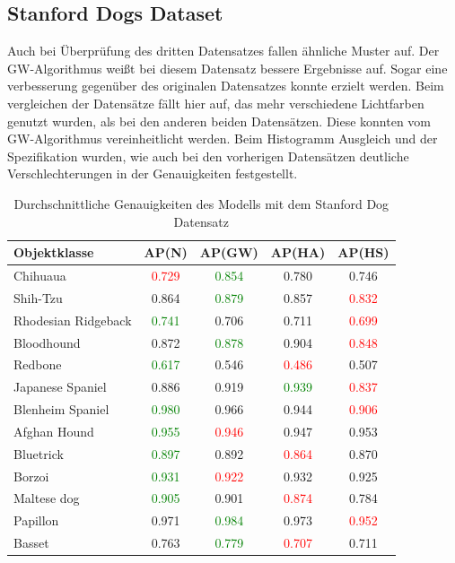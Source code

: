 \documentclass[a4paper,12pt,oneside]{article}
\begin{document}
  \subsection{Stanford Dogs Dataset}
Auch bei Überprüfung des dritten Datensatzes fallen ähnliche Muster auf. Der GW-Algorithmus weißt bei diesem Datensatz bessere Ergebnisse auf. Sogar eine verbesserung gegenüber des originalen Datensatzes konnte erzielt werden. Beim vergleichen der Datensätze fällt hier auf, das mehr verschiedene Lichtfarben genutzt wurden, als bei den anderen beiden Datensätzen. Diese konnten vom GW-Algorithmus vereinheitlicht werden. Beim Histogramm Ausgleich und der Spezifikation wurden, wie auch bei den vorherigen Datensätzen deutliche Verschlechterungen in der Genauigkeiten festgestellt.   
\begin{table}
[h]
\caption{Durchschnittliche Genauigkeiten des Modells mit dem Stanford Dog Datensatz}
\centering
\begin{tabular}{|l|c|c|c|c|}
\hline
Objektklasse & AP(N) & AP(GW) & AP(HA) & AP(HS)\\
\hline
Chihuaua & \textcolor{red}{0.729} & \textcolor{green}{0.854} & 0.780 & 0.746\\ 
Shih-Tzu & 0.864 & \textcolor{green}{0.879} & 0.857 & \textcolor{red}{0.832}\\
Rhodesian Ridgeback & \textcolor{green}{0.741} & 0.706 & 0.711 & \textcolor{red}{0.699}\\
Bloodhound & 0.872 & \textcolor{green}{0.878} & 0.904 & \textcolor{red}{0.848}\\
Redbone & \textcolor{green}{0.617} & 0.546 & \textcolor{red}{0.486} & 0.507\\ 
Japanese Spaniel & 0.886 & 0.919 & \textcolor{green}{0.939} & \textcolor{red}{0.837}\\
Blenheim Spaniel & \textcolor{green}{0.980} & 0.966 & 0.944 & \textcolor{red}{0.906}\\
Afghan Hound & \textcolor{green}{0.955} & \textcolor{red}{0.946} & 0.947 & 0.953\\
Bluetrick & \textcolor{green}{0.897} & 0.892 & \textcolor{red}{0.864} & 0.870\\ 
Borzoi & \textcolor{green}{0.931} & \textcolor{red}{0.922} & 0.932 & 0.925\\
Maltese dog & \textcolor{green}{0.905} & 0.901 & \textcolor{red}{0.874} & 0.784\\
Papillon & 0.971 & \textcolor{green}{0.984} & 0.973 & \textcolor{red}{0.952}\\
Basset & 0.763 & \textcolor{green}{0.779} & \textcolor{red}{0.707} & 0.711\\

\end{tabular}
\end{table}
\end{document}

